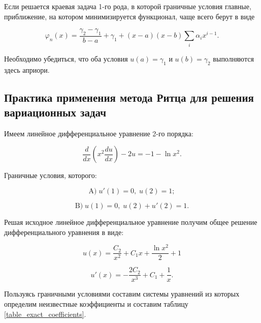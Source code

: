 Если решается краевая задача 1-го рода, в которой граничные условия главные, приближение, на котором минимизируется функционал, чаще всего берут в виде

\begin{displaymath}
	\varphi_{n}(x) = \frac{\gamma_{2} - \gamma_{1} }{ b - a } + \gamma_{1} + (x-a)(x-b) \sum_{i} \alpha_{i} x^{i - 1}.
\end{displaymath}

\begin{warn}[Важно!]
	Необходимо убедиться, что оба условия $u(a) = \gamma_{1}$ и $u(b) = \gamma_{2}$ выполняются здесь априори.
\end{warn}

\subsection{Практика применения метода Ритца для решения вариационных задач}

Имеем линейное дифференциальное уравнение 2-го порядка:

\begin{displaymath}
	\frac{d}{dx} \left( x^2 \frac{d u}{dx} \right) - 2u = -1 - \ln{x^2}.
\end{displaymath}

\noindent Граничные условия, которого:

\begin{displaymath}
	\text{A)} \; u'(1) = 0, \; u(2) = 1;
\end{displaymath}

\begin{displaymath}
	\text{B)} \; u(1) = 0, \; u(2) + u'(2) = 1.
\end{displaymath}

\noindent Решая исходное линейное дифференциальное уравнение получим общее решение дифференциального уравнения в виде:

\begin{displaymath}
	u(x) = \frac{C_{2}}{x^2} + C_{1}x + \frac{\ln{x^2}}{2} + 1
\end{displaymath}

\begin{displaymath}
	u'(x) = - \frac{2C_{2}}{x^3} + C_{1} + \frac{1}{x}.
\end{displaymath}

Пользуясь граничными условиями составим системы уравнений из которых определим неизвестные коэффициенты и составим таблицу \ref{table_exact_coefficients}. 

